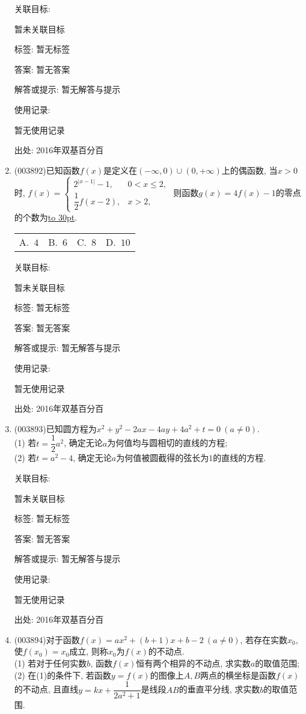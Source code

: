 \documentclass[10pt,a4paper]{article}
\newcommand{\blank}[1]{\underline{\hbox to #1pt{}}}
\newcommand{\fourch}[4]{\par\begin{tabular}{p{.23\textwidth}p{.23\textwidth}p{.23\textwidth}p{.23\textwidth}}
A.~#1 &B.~#2& C.~#3& D.~#4
\end{tabular}}
\begin{document}
\begin{enumerate}[1.]
关联目标:

暂未关联目标



标签: 暂无标签

答案: 暂无答案

解答或提示: 暂无解答与提示

使用记录:

暂无使用记录


出处: 2016年双基百分百
\item { (003892)}已知函数$f(x)$是定义在$(-\infty,0)\cup (0,+\infty)$上的偶函数, 当$x>0$时, $f(x)=\begin{cases}
2^{|x-1|}-1, & 0<x\le 2,\\\dfrac 12f(x-2), & x>2,
\end{cases}$ 则函数$g(x)=4f(x)-1$的零点的个数为\blank{30}.
\fourch{$4$}{$6$}{$8$}{$10$}


关联目标:

暂未关联目标



标签: 暂无标签

答案: 暂无答案

解答或提示: 暂无解答与提示

使用记录:

暂无使用记录


出处: 2016年双基百分百
\item { (003893)}已知圆方程为$x^2+y^2-2ax-4ay+4a^2+t=0 \ (a\ne 0)$.\\
(1) 若$t=\dfrac 12 a^2$, 确定无论$a$为何值均与圆相切的直线的方程;\\
(2) 若$t=a^2-4$, 确定无论$a$为何值被圆截得的弦长为$1$的直线的方程.


关联目标:

暂未关联目标



标签: 暂无标签

答案: 暂无答案

解答或提示: 暂无解答与提示

使用记录:

暂无使用记录


出处: 2016年双基百分百
\item { (003894)}对于函数$f(x)=ax^2+(b+1)x+b-2 \ (a\ne 0)$, 若存在实数$x_0$, 使$f(x_0)=x_0$成立, 则称$x_0$为$f(x)$的不动点.\\
(1) 若对于任何实数$b$, 函数$f(x)$恒有两个相异的不动点, 求实数$a$的取值范围;\\
(2) 在(1)的条件下, 若函数$y=f(x)$的图像上$A,B$两点的横坐标是函数$f(x)$的不动点, 且直线$y=kx+\dfrac{1}{2a^2+1}$是线段$AB$的垂直平分线, 求实数$b$的取值范围.



\end{enumerate}
\end{document}
